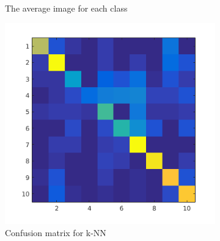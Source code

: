 \documentclass{article} %
\begin{document}
\begin{figure}[h]
\begin{subfigure}{.2\linewidth}
        \caption{The average image for each class}
        \end{subfigure}
        \begin{subfigure}{.2\linewidth}
            \centering
            \includegraphics[width=.5\linewidth]{knn-confusion.png}
            \caption{Confusion matrix for k-NN}
        \end{subfigure}
        \caption{}
    \end{figure}
\end{document}
